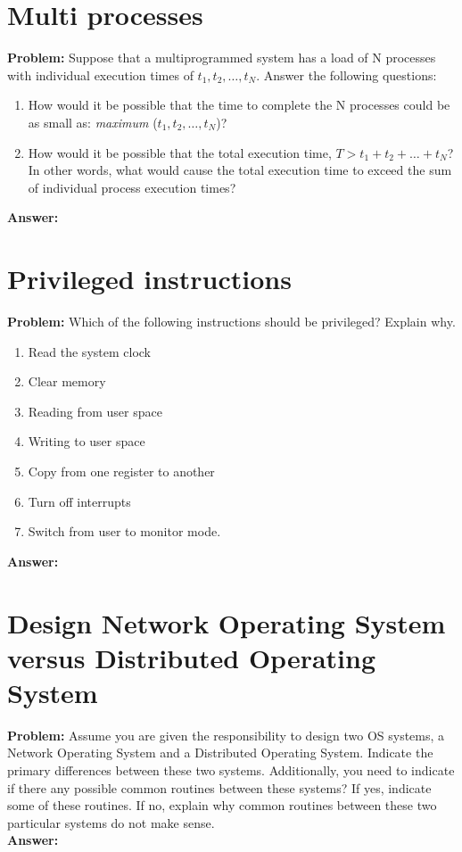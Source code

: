 \documentclass[a4paper]{article}
\begin{document}
\newpage
\section{Multi processes}
\textbf{Problem:}
Suppose that a multiprogrammed system has a load of N processes with individual execution times of $t_1, t_2, \ldots, t_N$. Answer the following questions:
\begin{enumerate}
    \item How would it be possible that the time to complete the N processes could be as small as: \textit{maximum} ($t_1, t_2, \ldots,t_N$)?
    \item How would it be possible that the total execution time, $T > t_1 + t_2 +\ldots+ t_N$? In other words, what would cause the total execution time to exceed the sum of individual process execution times?
\end{enumerate}
\textbf{Answer:}


\newpage
\section{Privileged instructions}
\textbf{Problem:}
Which of the following instructions should be privileged? Explain why.
\begin{enumerate}[label=\roman*.]
    \item Read the system clock
    \item Clear memory
    \item Reading from user space
    \item Writing to user space
    \item Copy from one register to another
    \item Turn off interrupts
    \item Switch from user to monitor mode.
\end{enumerate}
\textbf{Answer:}

\newpage
\section{Design Network Operating System versus Distributed Operating System}
\textbf{Problem:}
Assume you are given the responsibility to design two OS systems, a Network Operating System and a Distributed Operating System. Indicate the primary differences between these two systems.
Additionally, you need to indicate if there any possible common routines between these systems?
If yes, indicate some of these routines. If no, explain why common routines between these two particular systems do not make sense.
\\
\textbf{Answer:}
\end{document}
